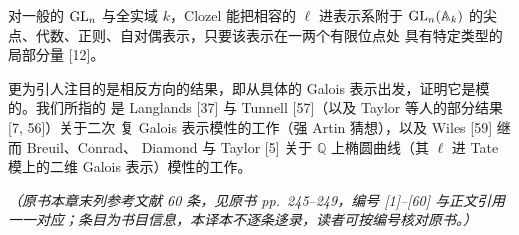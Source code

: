 对一般的 $\mathrm{GL}_n$ 与全实域 $k$，Clozel 能把相容的 $\ell$ 进表示系附于
$\mathrm{GL}_n(\mathbb{A}_k)$ 的尖点、代数、正则、自对偶表示，只要该表示在一两个有限位点处
具有特定类型的局部分量 [12]。

更为引人注目的是相反方向的结果，即从具体的 Galois 表示出发，证明它是模的。我们所指的
是 Langlands [37] 与 Tunnell [57]（以及 Taylor 等人的部分结果 [7, 56]）关于二次
复 Galois 表示模性的工作（强 Artin 猜想），以及 Wiles [59] 继而 Breuil、Conrad、
Diamond 与 Taylor [5] 关于 $\mathbb{Q}$ 上椭圆曲线（其 $\ell$ 进 Tate 模上的二维
Galois 表示）模性的工作。

\par\medskip
\noindent\textit{（原书本章末列参考文献 60 条，见原书 pp.~245--249，编号 [1]--[60]
与正文引用一一对应；条目为书目信息，本译本不逐条迻录，读者可按编号核对原书。）}
